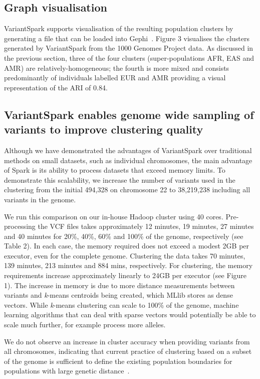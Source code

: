 \documentclass{bmcart}
\newcommand{\variantSpark}{{\sc VariantSpark}}
\newcommand{\kMeans}{\textit{k}-means}
\begin{document}
\subsection*{Graph visualisation}
\variantSpark{} supports visualisation of the resulting population clusters by generating a file that can be loaded into {\sc Gephi}~\cite{ICWSM09154}.
Figure 3 visualises the clusters generated by \variantSpark{} from the 1000 Genomes Project data. 
As discussed in the previous section, three of the four clusters (super-populations AFR, EAS and AMR) are relatively-homogeneous; the fourth is more mixed and 
consists predominantly of individuals labelled EUR and AMR providing a visual representation of the ARI of 0.84.


\subsection*{\variantSpark{} enables genome wide sampling of variants to improve clustering quality}
Although we have demonstrated the advantages of \variantSpark{} over traditional methods on small datasets, such as individual chromosomes, the main advantage of {\sc Spark} is its ability to process datasets that exceed memory limits.
To demonstrate this scalability, we increase the number of variants used in the clustering from the initial 494,328 on chromosome 22 to 38,219,238 including all variants in the genome.

We run this comparison on our in-house Hadoop cluster using 40 cores.
Pre-processing the VCF files takes approximately 12 minutes, 19 minutes, 27 minutes and 40 minutes for 20\%, 40\%, 60\% and 100\% of the genome, respectively (see Table 2).
In each case, the memory required does not exceed a modest 2GB per executor, even for the complete genome. 
Clustering the data takes 70 minutes, 139 minutes, 213 minutes and 884 mins, respectively.
For clustering, the memory requirements increase approximately linearly to 24GB per executor (see Figure 1). 
The increase in memory is due to more distance measurements between variants and \kMeans{} centroids being created, which MLlib stores as dense vectors. 
While \kMeans{} clustering can scale to 100\% of the genome, machine learning algorithms that can deal with sparse vectors would potentially be able to scale much further, for example process more alleles.

We do not observe an increase in cluster accuracy when providing variants from all chromosomes, indicating that current practice of clustering based on a subset of the genome is sufficient to define the existing population boundaries for populations with large genetic distance~\cite{Pugach2015}.
\end{document}
